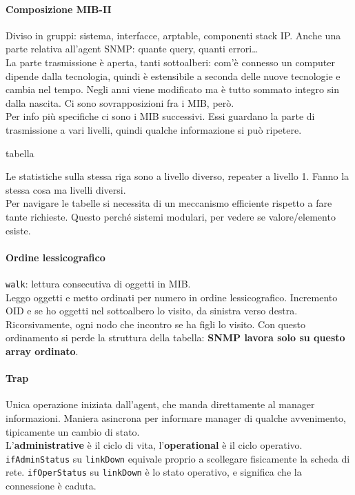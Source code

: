 \documentclass[10pt]{book}
\begin{document}
\paragraph{Composizione MIB-II} Diviso in gruppi: sistema, interfacce, arptable, componenti stack IP. Anche una parte relativa all'agent SNMP: quante query, quanti errori\ldots\\
La parte trasmissione è aperta, tanti sottoalberi: com'è connesso un computer dipende dalla tecnologia, quindi è estensibile a seconda delle nuove tecnologie e cambia nel tempo. Negli anni viene modificato ma è tutto sommato integro sin dalla nascita. Ci sono sovrapposizioni fra i MIB, però.\\
Per info più specifiche ci sono i MIB successivi. Essi guardano la parte di trasmissione a vari livelli, quindi qualche informazione si può ripetere.
\begin{center}
	tabella
\end{center}
Le statistiche sulla stessa riga sono a livello diverso, repeater a livello 1. Fanno la stessa cosa ma livelli diversi.\\
Per navigare le tabelle si necessita di un meccanismo efficiente rispetto a fare tante richieste. Questo perché sistemi modulari, per vedere se valore/elemento esiste.
\paragraph{Ordine lessicografico} \texttt{walk}: lettura consecutiva di oggetti in MIB.\\
Leggo oggetti e metto ordinati per numero in ordine lessicografico. Incremento OID e se ho oggetti nel sottoalbero lo visito, da sinistra verso destra. Ricorsivamente, ogni nodo che incontro se ha figli lo visito. Con questo ordinamento si perde la struttura della tabella: \textbf{SNMP lavora solo su questo array ordinato}.
\paragraph{Trap} Unica operazione iniziata dall'agent, che manda direttamente al manager informazioni. Maniera asincrona per informare manager di qualche avvenimento, tipicamente un cambio di stato.\\ L'\textbf{administrative} è il ciclo di vita, l'\textbf{operational} è il ciclo operativo.
\texttt{ifAdminStatus} su \texttt{linkDown} equivale proprio a scollegare fisicamente la scheda di rete. \texttt{ifOperStatus} su \texttt{linkDown} è lo stato operativo, e significa che la connessione è caduta.
\end{document}
